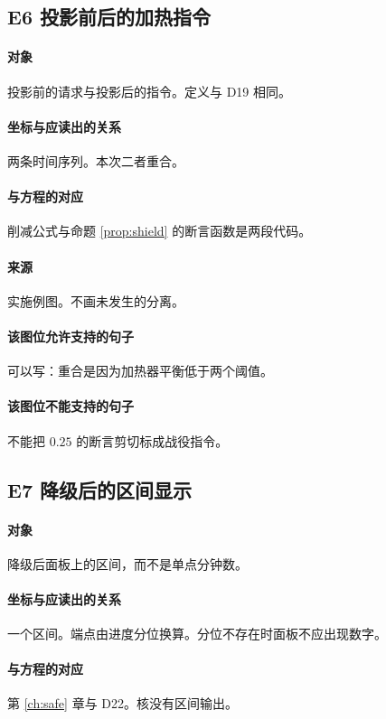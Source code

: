 \subsection{E6 投影前后的加热指令}
\paragraph{对象}
投影前的请求与投影后的指令。定义与 D19 相同。

\paragraph{坐标与应读出的关系}
两条时间序列。本次二者重合。

\paragraph{与方程的对应}
削减公式与命题 \ref{prop:shield} 的断言函数是两段代码。

\paragraph{来源}
实施例图。不画未发生的分离。

\paragraph{该图位允许支持的句子}
可以写：重合是因为加热器平衡低于两个阈值。

\paragraph{该图位不能支持的句子}
不能把 $0.25$ 的断言剪切标成战役指令。

\subsection{E7 降级后的区间显示}
\paragraph{对象}
降级后面板上的区间，而不是单点分钟数。

\paragraph{坐标与应读出的关系}
一个区间。端点由进度分位换算。分位不存在时面板不应出现数字。

\paragraph{与方程的对应}
第 \ref{ch:safe} 章与 D22。核没有区间输出。

